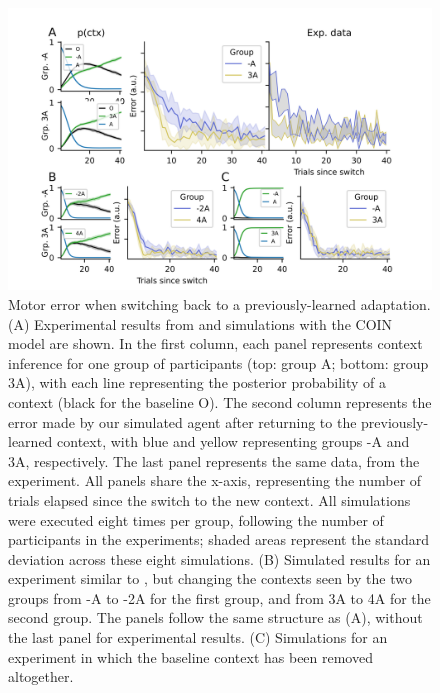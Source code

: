 \documentclass[a4paper,doc,floatsintext,natbib]{apa6}
\begin{document}
\begin{figure}
\centering
\includegraphics{./figures/figure_3.png}
\caption{Motor error when switching back to a previously-learned adaptation. (A) Experimental results from \cite{Davidson_Scaling_2004} and simulations with the COIN model are shown. In the first column, each panel represents context inference for one group of participants (top: group A; bottom: group 3A), with each line representing the posterior probability of a context (black for the baseline O). The second column represents the error made by our simulated agent after returning to the previously-learned context, with blue and yellow representing groups -A and 3A, respectively. The last panel represents the same data, from the \cite{Davidson_Scaling_2004} experiment. All panels share the x-axis, representing the number of trials elapsed since the switch to the new context. All simulations were executed eight times per group, following the number of participants in the experiments; shaded areas represent the standard deviation across these eight simulations. (B) Simulated results for an experiment similar to \cite{Davidson_Scaling_2004}, but changing the contexts seen by the two groups from -A to -2A for the first group, and from 3A to 4A for the second group. The panels follow the same structure as (A), without the last panel for experimental results. (C) Simulations for an experiment in which the baseline context has been removed altogether.}
\label{fig:davidson-2004}
\end{figure}
\end{document}
